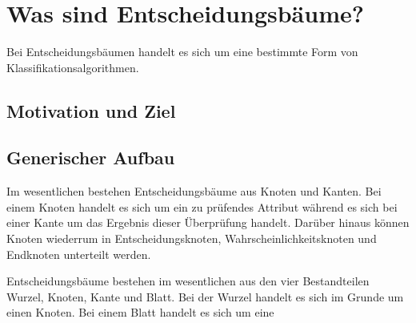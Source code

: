\chapter{Was sind Entscheidungsbäume?}
\label{was-sind-entscheidungsbaeume}

Bei Entscheidungsbäumen handelt es sich um eine bestimmte Form von Klassifikationsalgorithmen. 

\section{Motivation und Ziel}
\label{motivation}

\section{Generischer Aufbau}
\label{aufbau}
Im wesentlichen bestehen Entscheidungsbäume aus Knoten und Kanten. Bei einem Knoten handelt es sich um ein zu prüfendes Attribut während es sich bei einer Kante um das Ergebnis dieser Überprüfung handelt. \autocite{DataMining} Darüber hinaus können Knoten wiederrum in Entscheidungsknoten, Wahrscheinlichkeitsknoten und Endknoten unterteilt werden.

Entscheidungsbäume bestehen im wesentlichen aus den vier Bestandteilen Wurzel, Knoten, Kante und Blatt. Bei der Wurzel handelt es sich im Grunde um einen Knoten. 
Bei einem Blatt handelt es sich um eine 